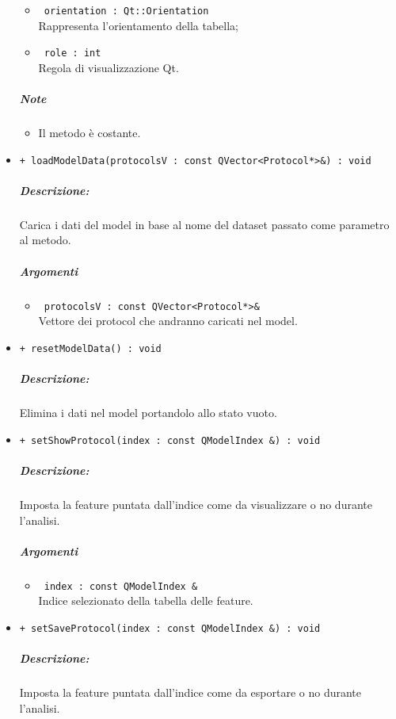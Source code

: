 \begin{itemize}
\begin{itemize}
			\item \color{RoyalPurple}\verb! orientation : Qt::Orientation!\\
			\color{black}Rappresenta l'orientamento della tabella;
			
			\item \color{RoyalPurple}\verb! role : int!\\
			\color{black}Regola di visualizzazione Qt\g{}.
		\end{itemize}
	\subparagraph{Note}
			\begin{itemize}
				\item Il metodo è costante.
			\end{itemize}		
	\item \color{blue}\verb!+ loadModelData(protocolsV : const QVector<Protocol*>&) : void!\\
		\color{black}
		\subparagraph{Descrizione:} Carica i dati del model in base al nome del dataset\g{} passato come parametro al metodo.
		\subparagraph{Argomenti}
			\begin{itemize}				
				\item \color{RoyalPurple}\verb! protocolsV : const QVector<Protocol*>&!\\
				\color{black} Vettore dei protocol\g{} che andranno caricati nel model.
			\end{itemize}			
	\item \color{blue}\verb!+ resetModelData() : void!\\
		\color{black}
		\subparagraph{Descrizione:} Elimina i dati nel model portandolo allo stato vuoto.\\		
	\item \color{blue}\verb!+ setShowProtocol(index : const QModelIndex &) : void!\\
		\color{black}
		\subparagraph{Descrizione:} Imposta la feature\g{} puntata dall'indice come da visualizzare o no durante l'analisi.
		\subparagraph{Argomenti}
			\begin{itemize}				
				\item \color{RoyalPurple}\verb! index : const QModelIndex &!\\
				\color{black} Indice selezionato della tabella delle feature\g{}.
			\end{itemize}			
	\item \color{blue}\verb!+ setSaveProtocol(index : const QModelIndex &) : void!\\
		\color{black}
		\subparagraph{Descrizione:} Imposta la feature\g{} puntata dall'indice come da esportare o no durante l'analisi.

\end{itemize}
